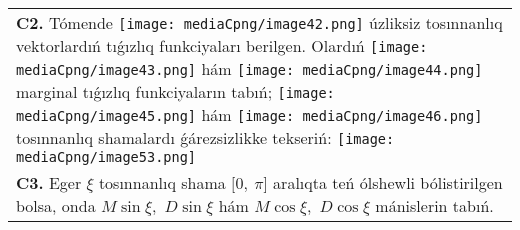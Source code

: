 \documentclass{article}
\begin{document}
\begin{tabular}{m{17cm}}
 \\
\textbf{C2.} Tómende \texttt{[image: mediaCpng/image42.png]} úzliksiz tosınnanlıq vektorlardıń tıǵızlıq funkciyaları berilgen. Olardıń \texttt{[image: mediaCpng/image43.png]} hám \texttt{[image: mediaCpng/image44.png]} marginal tıǵızlıq funkciyaların tabıń; \texttt{[image: mediaCpng/image45.png]} hám \texttt{[image: mediaCpng/image46.png]} tosınnanlıq shamalardı ǵárezsizlikke tekseriń: \texttt{[image: mediaCpng/image53.png]}
 \\
\textbf{C3.} Eger \(\xi\) tosınnanlıq shama \(\lbrack 0,\ \pi\rbrack\) aralıqta teń ólshewli bólistirilgen bolsa, onda \(M\sin\xi,\) \(D\sin\xi\) hám \(M\cos\xi,\) \(D\cos\xi\) mánislerin tabıń.
 \\

\end{tabular}
\vspace{1cm}
\end{document}
